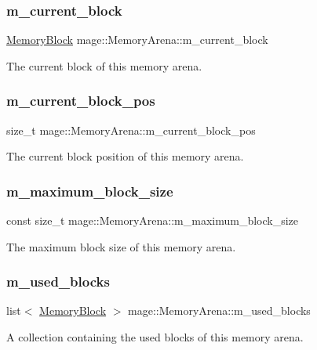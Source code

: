 \subsubsection{\texorpdfstring{m\+\_\+current\+\_\+block}{m\_current\_block}}
{\footnotesize\ttfamily \hyperlink{classmage_1_1_memory_arena_af41064ba5e850e5541873b3c8acb5067}{Memory\+Block} mage\+::\+Memory\+Arena\+::m\+\_\+current\+\_\+block\hspace{0.3cm}{\ttfamily [private]}}

The current block of this memory arena. \hypertarget{classmage_1_1_memory_arena_a880d07eb372ce1c8b907947fcbdfc59c}{}\label{classmage_1_1_memory_arena_a880d07eb372ce1c8b907947fcbdfc59c} 
\subsubsection{\texorpdfstring{m\+\_\+current\+\_\+block\+\_\+pos}{m\_current\_block\_pos}}
{\footnotesize\ttfamily size\+\_\+t mage\+::\+Memory\+Arena\+::m\+\_\+current\+\_\+block\+\_\+pos\hspace{0.3cm}{\ttfamily [private]}}

The current block position of this memory arena. \hypertarget{classmage_1_1_memory_arena_aeef4c56cf50fd3cbbba2879fcd028b86}{}\label{classmage_1_1_memory_arena_aeef4c56cf50fd3cbbba2879fcd028b86} 
\subsubsection{\texorpdfstring{m\+\_\+maximum\+\_\+block\+\_\+size}{m\_maximum\_block\_size}}
{\footnotesize\ttfamily const size\+\_\+t mage\+::\+Memory\+Arena\+::m\+\_\+maximum\+\_\+block\+\_\+size\hspace{0.3cm}{\ttfamily [private]}}

The maximum block size of this memory arena. \hypertarget{classmage_1_1_memory_arena_a37891872cff5b86bb1f9c40b4450b904}{}\label{classmage_1_1_memory_arena_a37891872cff5b86bb1f9c40b4450b904} 
\subsubsection{\texorpdfstring{m\+\_\+used\+\_\+blocks}{m\_used\_blocks}}
{\footnotesize\ttfamily list$<$ \hyperlink{classmage_1_1_memory_arena_af41064ba5e850e5541873b3c8acb5067}{Memory\+Block} $>$ mage\+::\+Memory\+Arena\+::m\+\_\+used\+\_\+blocks\hspace{0.3cm}{\ttfamily [private]}}

A collection containing the used blocks of this memory arena. 